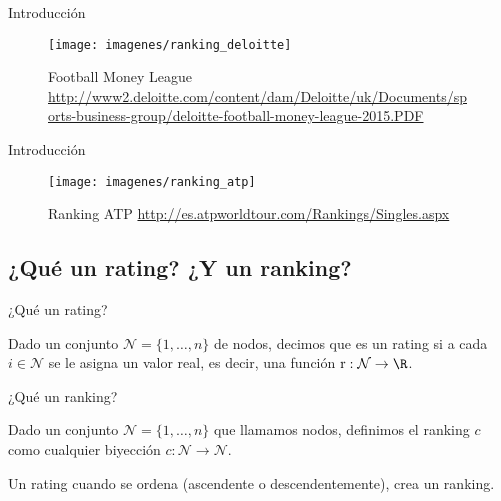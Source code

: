 \documentclass[10pt]{beamer}
\begin{document}
	\begin{frame}{Introducción}
		\begin{figure}
			\centering
			\texttt{[image: imagenes/ranking\_deloitte]}
			\caption{Football Money League \url{http://www2.deloitte.com/content/dam/Deloitte/uk/Documents/sports-business-group/deloitte-football-money-league-2015.PDF}}
			\label{fig:ranking_deloitte}
		\end{figure}
	\end{frame}
	
	\begin{frame}{Introducción}
		\begin{figure}
			\centering
			\texttt{[image: imagenes/ranking\_atp]}
			\caption{Ranking ATP \url{http://es.atpworldtour.com/Rankings/Singles.aspx}}
			\label{fig:ranking_atp}
		\end{figure}
	\end{frame}
	
	\subsection{¿Qué un rating? ¿Y un ranking?}
	
	\begin{frame}{¿Qué un rating?}
		\begin{defi}
			Dado un conjunto $\mathcal{N} = \{1,\dots, n\}$ de nodos, decimos que es un rating si a cada $i \in \mathcal{N}$ se le asigna un valor real, es decir, una función $\mathrm{r} : \mathcal{N} \to \R$.
		\end{defi}
	\end{frame}
	
	\begin{frame}{¿Qué un ranking?}
		\begin{defi} \label{def:ranking}
			Dado un conjunto $\mathcal{N} = \{1,\dots,n\}$ que llamamos nodos, definimos el ranking $c$ como cualquier biyección $c : \mathcal{N} \to \mathcal{N}$.
		\end{defi}
		
		Un rating cuando se ordena (ascendente o descendentemente), crea un ranking.
	\end{frame}
	
\end{document}

